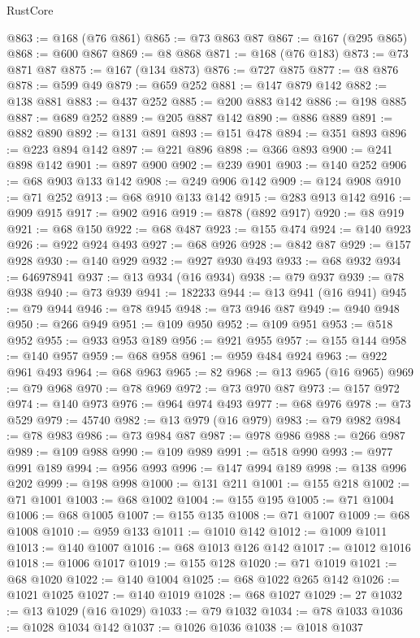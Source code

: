 \begin{lexlean}{RustCore}
\begin{coremodule}
@863 := @168 (@76 @861)
@865 := @73 @863 @87
@867 := @167 (@295 @865)
@868 := @600 @867
@869 := @8 @868
@871 := @168 (@76 @183)
@873 := @73 @871 @87
@875 := @167 (@134 @873)
@876 := @727 @875
@877 := @8 @876
@878 := @599 @49
@879 := @659 @252
@881 := @147 @879 @142
@882 := @138 @881
@883 := @437 @252
@885 := @200 @883 @142
@886 := @198 @885
@887 := @689 @252
@889 := @205 @887 @142
@890 := @886 @889
@891 := @882 @890
@892 := @131 @891
@893 := @151 @478
@894 := @351 @893
@896 := @223 @894 @142
@897 := @221 @896
@898 := @366 @893
@900 := @241 @898 @142
@901 := @897 @900
@902 := @239 @901
@903 := @140 @252
@906 := @68 @903 @133 @142
@908 := @249 @906 @142
@909 := @124 @908
@910 := @71 @252
@913 := @68 @910 @133 @142
@915 := @283 @913 @142
@916 := @909 @915
@917 := @902 @916
@919 := @878 (@892 @917)
@920 := @8 @919
@921 := @68 @150
@922 := @68 @487
@923 := @155 @474
@924 := @140 @923
@926 := @922 @924 @493
@927 := @68 @926
@928 := @842 @87
@929 := @157 @928
@930 := @140 @929
@932 := @927 @930 @493
@933 := @68 @932
@934 := 646978941
@937 := @13 @934 (@16 @934)
@938 := @79 @937
@939 := @78 @938
@940 := @73 @939
@941 := 182233
@944 := @13 @941 (@16 @941)
@945 := @79 @944
@946 := @78 @945
@948 := @73 @946 @87
@949 := @940 @948
@950 := @266 @949
@951 := @109 @950
@952 := @109 @951
@953 := @518 @952
@955 := @933 @953 @189
@956 := @921 @955
@957 := @155 @144
@958 := @140 @957
@959 := @68 @958
@961 := @959 @484 @924
@963 := @922 @961 @493
@964 := @68 @963
@965 := 82
@968 := @13 @965 (@16 @965)
@969 := @79 @968
@970 := @78 @969
@972 := @73 @970 @87
@973 := @157 @972
@974 := @140 @973
@976 := @964 @974 @493
@977 := @68 @976
@978 := @73 @529
@979 := 45740
@982 := @13 @979 (@16 @979)
@983 := @79 @982
@984 := @78 @983
@986 := @73 @984 @87
@987 := @978 @986
@988 := @266 @987
@989 := @109 @988
@990 := @109 @989
@991 := @518 @990
@993 := @977 @991 @189
@994 := @956 @993
@996 := @147 @994 @189
@998 := @138 @996 @202
@999 := @198 @998
@1000 := @131 @211
@1001 := @155 @218
@1002 := @71 @1001
@1003 := @68 @1002
@1004 := @155 @195
@1005 := @71 @1004
@1006 := @68 @1005
@1007 := @155 @135
@1008 := @71 @1007
@1009 := @68 @1008
@1010 := @959 @133
@1011 := @1010 @142
@1012 := @1009 @1011
@1013 := @140 @1007
@1016 := @68 @1013 @126 @142
@1017 := @1012 @1016
@1018 := @1006 @1017
@1019 := @155 @128
@1020 := @71 @1019
@1021 := @68 @1020
@1022 := @140 @1004
@1025 := @68 @1022 @265 @142
@1026 := @1021 @1025
@1027 := @140 @1019
@1028 := @68 @1027
@1029 := 27
@1032 := @13 @1029 (@16 @1029)
@1033 := @79 @1032
@1034 := @78 @1033
@1036 := @1028 @1034 @142
@1037 := @1026 @1036
@1038 := @1018 @1037

\end{coremodule}
\end{lexlean}
